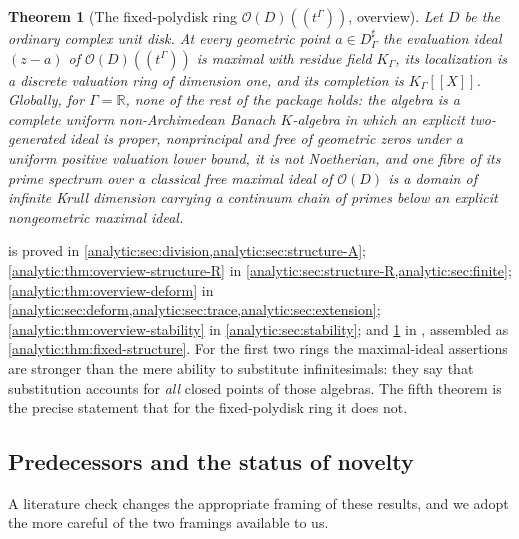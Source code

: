 \documentclass[11pt,letterpaper]{article}
\newtheorem{theorem}{Theorem}[section]
\theoremstyle{definition}
\theoremstyle{remark}
\newcommand{\R}{\mathbb R}
\newcommand{\OO}{\mathcal O}
\numberwithin{equation}{section}
\begin{document}
\begin{theorem}[The fixed-polydisk ring $\OO(D)((t^\Gamma))$, overview]
\label{analytic:thm:overview-fixed}
Let $D$ be the ordinary complex unit disk. At every geometric point
$a\in D^\sharp_\Gamma$ the evaluation ideal $(z-a)$ of $\OO(D)((t^\Gamma))$
is maximal with residue field $K_\Gamma$, its localization is a discrete
valuation ring of dimension one, and its completion is $K_\Gamma[[X]]$.
Globally, for $\Gamma=\R$, none of the rest of the package holds: the
algebra is a complete uniform non-Archimedean Banach $K$-algebra in which
an explicit two-generated ideal is proper, nonprincipal and free of
geometric zeros under a uniform positive valuation lower bound, it is not
Noetherian, and one fibre of its prime spectrum over a classical free
maximal ideal of $\OO(D)$ is a domain of infinite Krull dimension carrying
a continuum chain of primes below an explicit nongeometric maximal ideal.
\end{theorem}

 is proved in
\cref{analytic:sec:division,analytic:sec:structure-A};
\cref{analytic:thm:overview-structure-R} in
\cref{analytic:sec:structure-R,analytic:sec:finite};
\cref{analytic:thm:overview-deform} in
\cref{analytic:sec:deform,analytic:sec:trace,analytic:sec:extension};
\cref{analytic:thm:overview-stability} in \cref{analytic:sec:stability};
and \cref{analytic:thm:overview-fixed} in
,
assembled as \cref{analytic:thm:fixed-structure}.
For the first two rings the maximal-ideal assertions are stronger than the
mere ability to substitute infinitesimals: they say that substitution
accounts for \emph{all} closed points of those algebras. The fifth theorem
is the precise statement that for the fixed-polydisk ring it does not.

\subsection{Predecessors and the status of novelty}
\label{analytic:subsec:novelty}
A literature check changes the appropriate framing of these results, and we
adopt the more careful of the two framings available to us.
\end{document}
